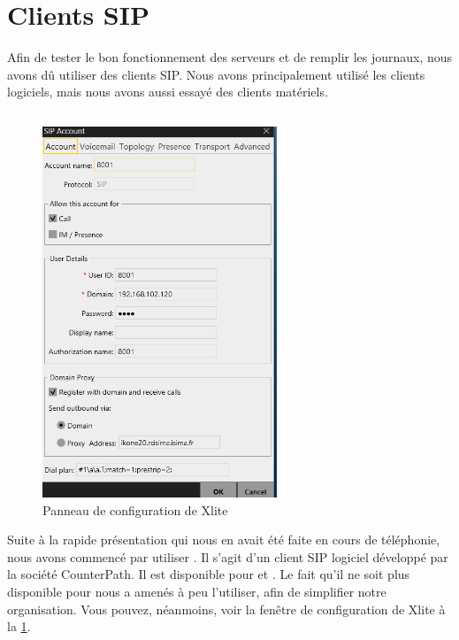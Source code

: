 \section{Clients SIP}

Afin de tester le bon fonctionnement des serveurs et de remplir les journaux, nous avons dû utiliser des clients SIP. Nous avons principalement utilisé les clients logiciels, mais nous avons aussi essayé des clients matériels.

\subsection{\xlite}

\begin{figure}[h]
\begin{center}
\includegraphics[width=7cm]{images/config-xlite.png}
\end{center}
\caption{Panneau de configuration de Xlite}
\label{confxlite}
\end{figure}

Suite à la rapide présentation qui nous en avait été faite en cours de téléphonie, nous avons commencé par utiliser {\xlite}. Il s'agit d'un client SIP logiciel développé par la société CounterPath. Il est disponible pour {\win} et {\mac}. Le fait qu’il ne soit plus disponible pour {\lnx} nous a amenés à peu l’utiliser, afin de simplifier notre organisation. Vous pouvez, néanmoins, voir la fenêtre de configuration de Xlite à la \cref{confxlite}. 

